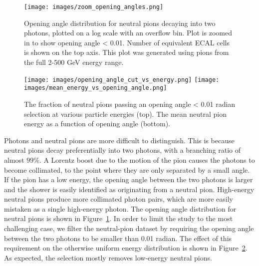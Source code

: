 \begin{figure}[htbp]
\centering
\texttt{[image: images/zoom\_opening\_angles.png]}
\caption{Opening angle distribution for neutral pions decaying into two photons, plotted on a log scale with an overflow bin. Plot is zoomed in to show opening angle < 0.01. Number of equivalent ECAL cells is shown on the top axis. This plot was generated using pions from the full 2-500 GeV energy range.}
\label{fig:opening_angle}
\end{figure}

\begin{figure}[htbp]
\centering
\texttt{[image: images/opening\_angle\_cut\_vs\_energy.png]}
\texttt{[image: images/mean\_energy\_vs\_opening\_angle.png]}
\caption{The fraction of neutral pions passing an opening angle < 0.01 radian selection at various particle energies (top). The mean neutral pion energy as a function of opening angle (bottom).}
\label{fig:opening_angle_energy}
\end{figure}

Photons and neutral pions are more difficult to distinguish. This is because neutral pions decay preferentially into two photons, with a branching ratio of almost $99\%$. A Lorentz boost due to the motion of the pion causes the photons to become collimated, to the point where they are only separated by a small angle. If the pion has a low energy, the opening angle between the two photons is larger and the shower is easily identified as originating from a neutral pion. High-energy neutral pions produce more collimated photon pairs, which are more easily mistaken as a single high-energy photon. The opening angle distribution for neutral pions is shown in Figure~\ref{fig:opening_angle}. In order to limit the study to the most challenging case, we filter the neutral-pion dataset by requiring the opening angle between the two photons to be smaller than 0.01 radian.  The effect of  this requirement on the otherwise uniform energy distribution is shown in Figure~\ref{fig:opening_angle_energy}. As expected, the selection mostly removes low-energy neutral pions. 


